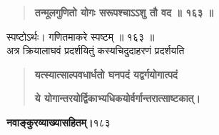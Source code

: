 \documentclass[11pt, openany]{book}
\begin{document}
\begin{sloppypar}
\begin{quote}
\hspace{1in}\textbf{तन्मूलगुणितो योगः सरूपश्चाऽऽशु तौ वद ॥ १६३ ॥}
\end{quote}

\hangindent=0.2in \hspace{0.2in}स्पष्टोऽर्थः। गणितमाकरे स्पष्टम् ॥ १६३ ॥\\

\hangindent=0.2in \hspace{0.2in}अत्र क्रियालाघवं प्रदर्शयितुं कस्यचिदुदाहरणं प्रदर्शयति\textendash

\begin{quote}
\hspace{1in}\textbf{यत्स्यात्साल्पवधार्धतो घनपदं यद्वर्गयोगात्पदं}

\hspace{1in}\textbf{ये योगान्तरयोर्द्विकाभ्यधिकयोर्वर्गान्तरात्साष्टकात्।}
\end{quote}
 \end{sloppypar}
\thispagestyle{empty}
\newpage

\onehalfspacing
\hspace{2in}\textbf{नवाङ्कुरव्याख्यासहितम्।}\hspace{2in}१८३

\vspace{5mm}
\end{document}

